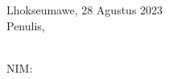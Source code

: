 \vspace*{2cm}
\hspace*{8cm} %
\begin{minipage}[t]{0.45\linewidth} %
    \noindent
    Lhokseumawe, 28 Agustus 2023\\Penulis,
    
    \vspace*{2cm}
    \textbf{\mahasiswa} \\
    NIM: \nim
\end{minipage}